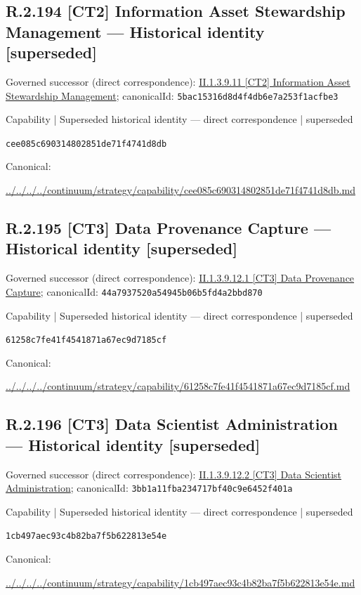 \documentclass[10pt,a4paper]{article}
\begin{document}
\subsection*{R.2.194 [CT2] Information Asset Stewardship Management — Historical identity [superseded]}
Governed successor (direct correspondence): \hyperref[element-5bac15316d8d4f4db6e7a253f1acfbe3]{II.1.3.9.11 [CT2] Information Asset Stewardship Management}; canonicalId: \texttt{5bac15316d8d4f4db6e7a253f1acfbe3}\par
\label{element-cee085c690314802851de71f4741d8db}
{\small Capability | Superseded historical identity — direct correspondence | superseded}\par
\texttt{cee085c690314802851de71f4741d8db}\par
Canonical: \par
{\footnotesize\url{../../../../continuum/strategy/capability/cee085c690314802851de71f4741d8db.md}}\par
\subsection*{R.2.195 [CT3] Data Provenance Capture — Historical identity [superseded]}
Governed successor (direct correspondence): \hyperref[element-44a7937520a54945b06b5fd4a2bbd870]{II.1.3.9.12.1 [CT3] Data Provenance Capture}; canonicalId: \texttt{44a7937520a54945b06b5fd4a2bbd870}\par
\label{element-61258c7fe41f4541871a67ec9d7185cf}
{\small Capability | Superseded historical identity — direct correspondence | superseded}\par
\texttt{61258c7fe41f4541871a67ec9d7185cf}\par
Canonical: \par
{\footnotesize\url{../../../../continuum/strategy/capability/61258c7fe41f4541871a67ec9d7185cf.md}}\par
\subsection*{R.2.196 [CT3] Data Scientist Administration — Historical identity [superseded]}
Governed successor (direct correspondence): \hyperref[element-3bb1a11fba234717bf40c9e6452f401a]{II.1.3.9.12.2 [CT3] Data Scientist Administration}; canonicalId: \texttt{3bb1a11fba234717bf40c9e6452f401a}\par
\label{element-1cb497aec93c4b82ba7f5b622813e54e}
{\small Capability | Superseded historical identity — direct correspondence | superseded}\par
\texttt{1cb497aec93c4b82ba7f5b622813e54e}\par
Canonical: \par
{\footnotesize\url{../../../../continuum/strategy/capability/1cb497aec93c4b82ba7f5b622813e54e.md}}\par
\end{document}
